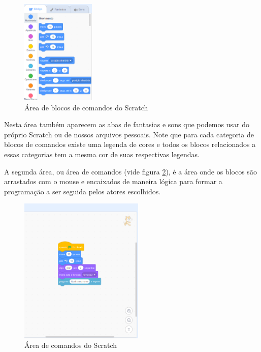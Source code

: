\documentclass[12pt, openright, a4paper, brazil, english, french, spanish, bibjustif, openany, oneside]{abntex2}
\begin{document}
\begin{figure}[h]

    \center
    \caption{Área de blocos de comandos do Scratch \label{scr2}}
    \includegraphics[height=5cm]{scratch2.png}
    
\end{figure}


Nesta área também aparecem as abas de fantasias e sons que podemos usar do próprio Scratch ou de nossos arquivos pessoais. Note que para cada categoria de blocos de comandos existe uma legenda de cores e todos os blocos relacionados a essas categorias tem a mesma cor de suas respectivas legendas.

A segunda área, ou área de comandos (vide figura \ref{scr3}), é a área onde os blocos são arrastados com o mouse e encaixados de maneira lógica para formar a programação a ser seguida pelos atores escolhidos.

\begin{figure}[h]

    \center
    \caption{Área de comandos do Scratch \label{scr3}}
    \includegraphics[height=7cm]{scratch3.png}
    
\end{figure}
\end{document}
